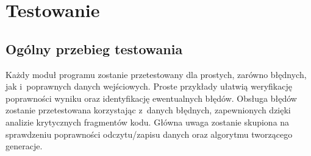 \documentclass[a4paper,11pt]{article}
\begin{document}
		\section{Testowanie}
			\subsection{Ogólny przebieg testowania}
				Każdy moduł programu zostanie przetestowany dla prostych, zarówno błędnych, jak i~poprawnych danych wejściowych. Proste przykłady ułatwią weryfikację poprawności wyniku oraz identyfikację ewentualnych błędów. Obsługa błędów zostanie przetestowana korzystając z~danych błędnych, zapewnionych dzięki analizie krytycznych fragmentów kodu. Główna uwaga zostanie skupiona na sprawdzeniu poprawności odczytu/zapisu danych oraz algorytmu tworzącego generacje.		
\end{document}
